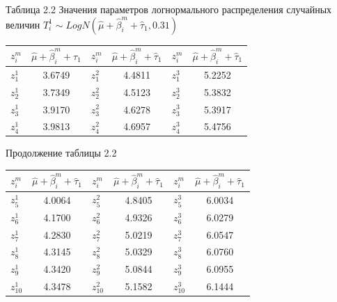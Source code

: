 \documentclass[14pt, a4paper]{extarticle}
\numberwithin{equation}{section}
\begin{document}
{\begin{table}[h!]
\centering
\begin{flushright}
Таблица 2.2 Значения параметров логнормального распределения случайных величин $T_i^1 \sim LogN(\hat{\mu}+\hat{\beta}_i^m+\hat{\tau}_1,0.31)$
\end{flushright}
\begin{tabular}{|>{\centering}m{60pt}|c|>{\centering}m{60pt}|c|>{\centering}m{60pt}|c|}
\hline
$z_i^m$ 	&$\hat{\mu}+\hat{\beta}_i^m+\hat{\tau}_1$ & $z_i^m$	& $\hat{\mu}+\hat{\beta}_i^m+\hat{\tau}_1$ & $z_i^m$ & $\hat{\mu}+\hat{\beta}_i^m+\hat{\tau}_1$ \\ \hline
$z_1^1$		& 3.6749							  & $z_1^2$	& 4.4811							   & $z_1^3$ & 5.2252 \\ \hline
$z_2^1$		& 3.7349							  & $z_2^2$	& 4.5123							   & $z_2^3$ & 5.3832 \\ \hline
$z_3^1$		& 3.9170							  & $z_3^2$	& 4.6278							   & $z_3^3$ & 5.3917 \\ \hline
$z_4^1$		& 3.9813							  & $z_4^2$	& 4.6957							   & $z_4^3$ & 5.4756 \\ \hline
\end{tabular}
\label{ch2}
\end{table}

\begin{table}[h!]
\centering
\begin{flushright}
Продолжение таблицы 2.2
\end{flushright}
\begin{tabular}{|>{\centering}m{57pt}|c|>{\centering}m{57pt}|c|>{\centering}m{57pt}|c|}
\hline
$z_i^m$ 	&$\hat{\mu}+\hat{\beta}_i^m+\hat{\tau}_1$ & $z_i^m$	& $\hat{\mu}+\hat{\beta}_i^m+\hat{\tau}_1$ & $z_i^m$ & $\hat{\mu}+\hat{\beta}_i^m+\hat{\tau}_1$ \\ \hline
$z_5^1$		& 4.0064							  & $z_5^2$	& 4.8405							   & $z_5^3$ & 6.0034 \\ \hline
$z_6^1$		& 4.1700							  & $z_6^2$	& 4.9326							   & $z_6^3$ & 6.0279 \\ \hline
$z_7^1$		& 4.2830							  & $z_7^2$	& 5.0219							   & $z_7^3$ & 6.0547 \\ \hline
$z_8^1$		& 4.3145							  & $z_8^2$	& 5.0329							   & $z_8^3$ & 6.0760 \\ \hline
$z_9^1$		& 4.3420							  & $z_9^2$	& 5.0844							   & $z_9^3$ & 6.0955 \\ \hline
$z_{10}^1$	& 4.3478							  & $z_{10}^2$	& 5.1582						   & $z_{10}^3$	& 6.1444 \\ \hline
\end{tabular}
\label{ch2}
\end{table}

}
\end{document}
